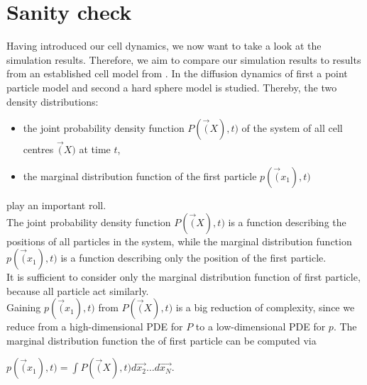 \section{Sanity check}
Having introduced our cell dynamics, we now want to take a look at the simulation results.
Therefore, we aim to compare our simulation results to results from an established cell model from \cite{Bruna2012}. 
In \cite{Bruna2012} the diffusion dynamics of first a point particle model and second a hard sphere model is studied. 
Thereby, the two density distributions:
\begin{itemize}
    \item the joint probability density function $P(\vec(X), t)$ of the system of all cell centres $\vec(X)$ at time $t$,
    \item the marginal distribution function of the first particle $p(\vec(x_1), t)$
\end{itemize}
play an important roll. \\
The joint probability density function $P(\vec(X), t)$ is a function describing the positions of all particles in the system, while the marginal distribution function $p(\vec(x_1), t)$ is a function describing only the position of the first particle. \\
It is sufficient to consider only the marginal distribution function of first particle, because all particle act similarly. \\ 
Gaining $p(\vec(x_1), t)$ from $P(\vec(X), t)$ is a big reduction of complexity, since we reduce from a high-dimensional PDE for $P$ to a low-dimensional PDE for $p$. 
The marginal distribution function the of first particle can be computed via
\begin{center}
    $
    p(\vec(x_1), t) = \int P(\vec(X), t) d\vec{x_2} \dots  d\vec{x_N}.
    $
\end{center} 

